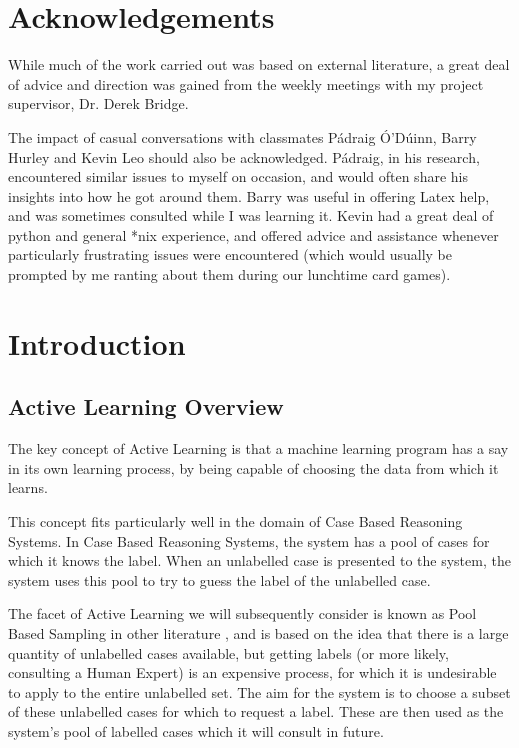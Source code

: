 \documentclass[a4paper,11pt]{report}
\begin{document}
\chapter*{Acknowledgements}
While much of the work carried out was based on external literature, a great deal of advice and direction was gained from the weekly meetings with my project supervisor, Dr. Derek Bridge.

The impact of casual conversations with classmates P\'{a}draig \'{O}'D\'{u}inn, Barry Hurley and Kevin Leo should also be acknowledged. P\'{a}draig, in his research, encountered similar issues to myself on occasion, and would often share his insights into how he got around them. Barry was useful in offering Latex help, and was sometimes consulted while I was learning it. Kevin had a great deal of python and general *nix experience, and offered advice and assistance whenever particularly frustrating issues were encountered (which would usually be prompted by me ranting about them during our lunchtime card games).

\tableofcontents

\chapter{Introduction}
\section{Active Learning Overview}
The key concept of Active Learning is that a machine learning program has a say in its own learning process, by being capable of choosing the data from which it learns. 

This concept fits particularly well in the domain of Case Based Reasoning Systems. In Case Based Reasoning Systems, the system has a pool of cases for which it knows the label. When an unlabelled case is presented to the system, the system uses this pool to try to guess the label of the unlabelled case.

The facet of Active Learning we will subsequently consider is known as Pool Based Sampling in other literature \cite{Settles2010}, and is based on the idea that there is a large quantity of unlabelled cases available, but getting labels (or more likely, consulting a Human Expert) is an expensive process, for which it is undesirable to apply to the entire unlabelled set. The aim for the system is to choose a subset of these unlabelled cases for which to request a label. These are then used as the system's pool of labelled cases which it will consult in future.
\end{document}
